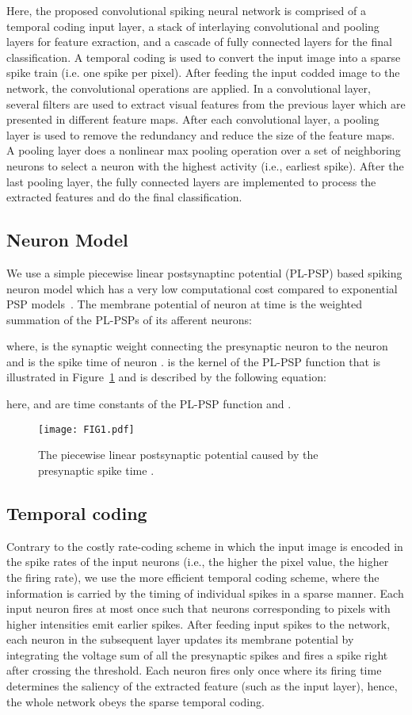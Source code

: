 \documentclass[preprint,twocolumn,5p,12pt]{article}
\begin{document}
Here, the proposed convolutional spiking neural network is comprised of a temporal coding input layer, a stack of interlaying convolutional and pooling layers for feature exraction, and a cascade of fully connected layers for the final classification. 
A temporal coding is used to convert the input image into a sparse spike train (i.e. one spike per pixel). After feeding the input codded image to the network, the convolutional operations are applied. 
In a convolutional layer, several filters are used to extract visual features from the previous layer which are presented in different feature maps. 
After each convolutional layer, a pooling layer is used to remove the redundancy and reduce the size of the feature maps.
A pooling layer does a nonlinear max pooling operation over a set of neighboring neurons to select a neuron with the highest activity (i.e., earliest spike).
After the last pooling layer, the fully connected layers are implemented to process the extracted features and do the final classification.

\subsection{Neuron Model}
We use a simple piecewise linear postsynaptinc potential
(PL-PSP) based spiking neuron model which has a very low computational cost compared to exponential PSP models~\cite{R3}. The membrane potential  of neuron 
at time  is the weighted summation of the PL-PSPs of its afferent neurons:

where,  is the synaptic weight connecting the presynaptic neuron  to the neuron  and  is the spike time of neuron .  is the kernel of the PL-PSP function that is illustrated in Figure~\ref{FIG1} and is described by the following equation:


here,  and  are time constants of the PL-PSP function and .
\begin{figure}
\centering
\texttt{[image: FIG1.pdf]} \caption{The piecewise linear postsynaptic potential caused by the presynaptic spike time .}
\label{FIG1}
\end{figure}

\subsection{Temporal coding}
Contrary to the costly rate-coding scheme in which the input image is encoded in the spike rates of the input neurons (i.e., the higher the pixel value, the higher the firing rate), we use the more efficient temporal coding scheme\cite{R3}, where the information is carried by the timing of individual spikes in a sparse manner. Each input neuron fires at most once such that neurons corresponding to pixels with higher intensities emit earlier spikes.
After feeding input spikes to the network, each neuron in the subsequent layer updates its membrane potential by integrating the voltage sum of all the presynaptic spikes and fires a spike right after crossing the threshold. Each neuron fires only once where its firing time determines the saliency of the extracted feature (such as the input layer), hence, the whole network obeys the sparse temporal coding.
\end{document}
